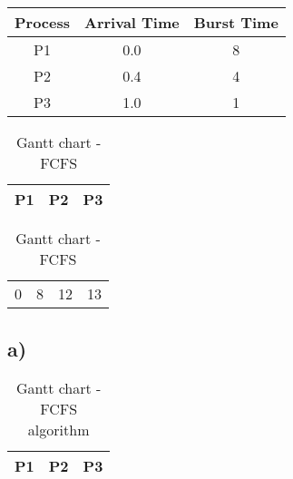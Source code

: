 \documentclass[12pt,a4paper]{article}
\begin{document}
\section{}

\begin{center}
    \begin{tabular}{c|c|c}
        Process & Arrival Time & Burst Time \\ \hline
        P1 & 0.0 & 8\\
        P2 & 0.4 & 4\\
        P3 & 1.0 & 1
    \end{tabular}
\end{center}

\begin{table}[!htp]
    \centering            %
    \def\arraystretch{2}  %
    
    \begin{tabular}{|m{8cm}|m{4cm}|m{1cm}|}
        \hline
        P1 & P2 & P3 \\
        \hline
    \end{tabular}

    \begin{tabular}{m{8cm} m{4cm} m{1cm} l }
        0 & 8 & 12 & 13 \\
    \end{tabular}
    
    \caption{Gantt chart - FCFS}
\end{table}

\subsection*{a)}

\begin{table}[h]
    \centering
    \begin{tabular}{|c|c|c|}
    \hline
    P1 \hspace{4cm} & P2 \hspace{2cm} & P3\\
    \hline 
    \end{tabular}
    \\
    
    \caption{Gantt chart - FCFS algorithm}
\end{table}
\end{document}
